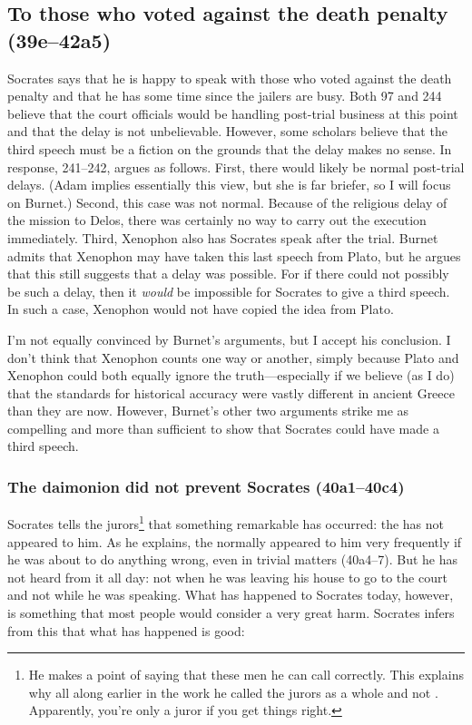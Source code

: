 \documentclass[11pt]{article}
\begin{document}
\subsection{To those who voted against the death penalty (39e--42a5)}

Socrates says that he is happy to speak with those who voted against the death penalty and that he has some time since the jailers are busy.  Both \citet{adam1914} 97 and \citet{burnet1924} 244 believe that the court officials would be handling post-trial business at this point and that the delay is not unbelievable.  However, some scholars believe that the third speech must be a fiction on the grounds that the delay makes no sense.  In response, \citet{burnet1924} 241--242, argues as follows. First, there would likely be normal post-trial delays.  (Adam implies essentially this view, but she is far briefer, so I will focus on Burnet.)  Second, this case was not normal.  Because of the religious delay of the mission to Delos, there was certainly no way to carry out the execution immediately.  Third, Xenophon also has Socrates speak after the trial.  Burnet admits that Xenophon may have taken this last speech from Plato, but he argues that this still suggests that a delay was possible.  For if there could not possibly be such a delay, then it \textit{would} be impossible for Socrates to give a third speech.  In such a case, Xenophon would not have copied the idea from Plato.

I'm not equally convinced by Burnet's arguments, but I accept his conclusion.  I don't think that Xenophon counts one way or another, simply because Plato and Xenophon could both equally ignore the truth---especially if we believe (as I do) that the standards for historical accuracy were vastly different in ancient Greece than they are now.  However, Burnet's other two arguments strike me as compelling and more than sufficient to show that Socrates could have made a third speech.

\subsubsection{The daimonion did not prevent Socrates (40a1--40c4)}

Socrates tells the jurors\footnote{He makes a point of saying that these men he can call  correctly.  This explains why all along earlier in the work he called the jurors as a whole  and not .  Apparently, you're only a juror if you get things right.} that something remarkable has occurred: the  has not appeared to him.  As he explains, the  normally appeared to him very frequently if he was about to do anything wrong, even in trivial matters (40a4--7).  But he has not heard from it all day: not when he was leaving his house to go to the court and not while he was speaking.  What has happened to Socrates today, however, is something that most people would consider a very great harm.  Socrates infers from this that what has happened is good:
\end{document}
